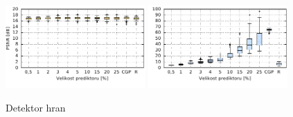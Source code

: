 \begin{figure}[H]
    \centering
    \includegraphics[width=0.475\textwidth]{fig/plot/compare/sobelsobel1b-100kg-psnr.pdf}
    \hskip0.5cm
    \includegraphics[width=0.475\textwidth]{fig/plot/compare/sobelsobel1b-100kg-usertime.pdf}
    \caption{Detektor hran}
\end{figure}
